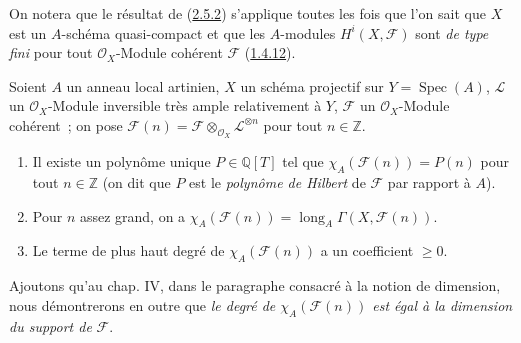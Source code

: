 On notera que le résultat de (\hyperref[III.2.5.2-fr]{2.5.2}) s'applique
toutes les fois que l'on sait que $X$ est un $A$-schéma quasi-compact et
que les $A$-modules $H^i(X,\mathcal F)$ sont \emph{de type fini} pour tout
$\mathcal O_X$-Module cohérent $\mathcal F$
(\hyperref[III.1.4.12-fr]{1.4.12}).

\begin{theorem}[2.5.3]
\label{III.2.5.3-fr}
Soient $A$ un anneau local artinien, $X$ un schéma projectif sur
$Y=\operatorname{Spec}(A)$, $\mathcal L$ un $\mathcal O_X$-Module
inversible très ample relativement à $Y$, $\mathcal F$ un
$\mathcal O_X$-Module cohérent~; on pose
$\mathcal F(n)=\mathcal F\otimes_{\mathcal O_X}\mathcal L^{\otimes n}$
pour tout $n\in\mathbb Z$.
\begin{enumerate}
\item[\textup{(i)}] Il existe un polynôme unique $P\in\mathbb Q[T]$ tel que
$\chi_A(\mathcal F(n))=P(n)$ pour tout $n\in\mathbb Z$ \textup{(on dit que $P$
est le \emph{polynôme de Hilbert} de $\mathcal F$ par rapport à $A$)}.
\item[\textup{(ii)}] Pour $n$ assez grand, on a
$\chi_A(\mathcal F(n))=\operatorname{long}_A
\Gamma(X,\mathcal F(n))$.
\item[\textup{(iii)}] Le terme de plus haut degré de $\chi_A(\mathcal F(n))$ a un
coefficient $\geq0$.
\end{enumerate}
\end{theorem}

Ajoutons qu'au chap. IV, dans le paragraphe consacré à la notion de
dimension, nous démontrerons en outre que \emph{le degré de
$\chi_A(\mathcal F(n))$ est égal à la dimension du support de}
$\mathcal F$.

